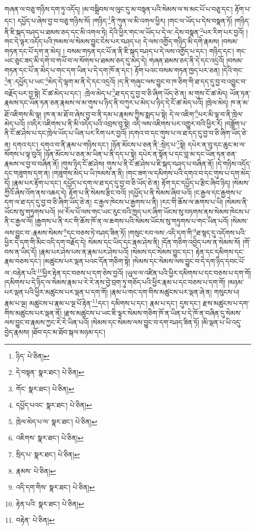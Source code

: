གཞན་ལ་བཅུ་གཉིས་དག་ཏུ་འདོད། །མ་བསྒྲིབས་ལ་ལུང་དུ་མ་བསྟན་པའི་སེམས་ལ་ས་མང་པོ་པ་བཅུ་དང་། རྟོག་པ་དང་། དཔྱོད་པ་ཞེས་བྱ་བ་བཅུ་གཉིས་སོ། །གཉིད་\footnote{ཉིད་  པེ་ཅིན། }ནི་ཀུན་ལ་མི་འགལ་ཕྱིར། །གང་ལ་ཡོད་པ་དེས་བསྣན་ཏོ། །གཉིད་ནི་ཇི་སྐད་བཤད་པ་ཐམས་ཅད་དང་མི་འགལ་ཏེ། དེའི་ཕྱིར་གང་ལ་ཡོད་པ་དེ་ལ་:དེས་བསྣན་\footnote{དེ་བསྟན་  སྣར་ཐང་།  པེ་ཅིན། }པར་རིག་པར་བྱའོ། །གང་དེ་ལྟར་འདོད་པའི་ཁམས་ལ་སེམས་བྱུང་ངེས་པར་བཤད་པ། དེ་ལས་འགྱོད་གཉིད་མི་དགེ་རྣམས། །བསམ་གཏན་དང་པོ་དག་ན་མེད། །
བསམ་གཏན་དང་པོ་ན་ནི་ཇི་སྐད་བཤད་པ་དེ་ལས་འགྱོད་པ་དང་། གཉིད་དང་། གང་ཡང་ཅུང་ཟད་མི་དགེ་བ་གཡོ་བ་ལ་སོགས་པ་ཐམས་ཅད་དུ་མེད་དེ། གཞན་ཐམས་ཅད་ནི་དེ་དང་འདྲའོ། །བསམ་གཏན་དང་པོ་ན་མེད་པ་གང་དག་ཡིན་པ་དེ་དག་ཁོ་ན་དང་། རྟོག་པའང་བསམ་གཏན་ཁྱད་པར་ཅན། །དེའི་གང་\footnote{གོང་  སྣར་ཐང་།  པེ་ཅིན། }ན་:དཔྱོད་པ་ཡང་\footnote{དཔྱོད་པའང་  སྣར་ཐང་།  པེ་ཅིན། }མེད་དེ་ལྷག་མ་ནི་དེ་དང་འདྲའོ། །ད་ནི་གཞུང་ལས་བྱུང་བ་ཁ་ཅིག་གི་ཐ་དད་དུ་བྱ་བ་འབྱུང་བ་བརྗོད་པར་བྱ་སྟེ། ངོ་ཚ་མེད་པ་དང་། :ཁྲེལ་མེད་པ་\footnote{ཁྲེལ་མེད་པ་ལ་  སྣར་ཐང་།  པེ་ཅིན། }ཐ་དད་དུ་བྱ་བ་ཅི་ཞིག་ཡོད་ཅེ་ན། མ་གུས་ངོ་ཚ་མེད། ཡོན་ཏན་རྣམས་དང་ཡོན་ཏན་ཅན་རྣམས་ལ་མ་གུས་པ་ཉིད་ནི་བཀུར་པ་མེད་པ་ཉིད་དེ་ངོ་ཚ་མེད་པའོ། །ཁྲེལ་མེད། ཁ་ན་མ་ཐོ་འཇིགས་མི་ལྟ། །ཁ་ན་མ་ཐོ་བ་ཞེས་བྱ་བ་ནི་དམ་པ་རྣམས་ཀྱིས་སྨད་པ་སྟེ། དེ་ལ་འཇིག་\footnote{འཇིགས་  སྣར་ཐང་།  པེ་ཅིན། }པར་མི་ལྟ་བ་ནི་ཁྲེལ་མེད་པའོ། །འདིར་འཇིགས་པ་ནི་མི་འདོད་པའི་འབྲས་བུ་སྟེ། འདི་ལས་འཇིགས་པར་འགྱུར་བའི་ཕྱིར་རོ། །བཟློག་པ་ནི་ངོ་ཚ་ཤེས་པ་དང་ཁྲེལ་ཡོད་པ་ཡིན་པར་རིག་པར་བྱའོ། །དགའ་བ་དང་གུས་པ་ལ་ཐ་དད་དུ་བྱ་བ་ཅི་ཞིག་ཡོད་ཅེ་ན། དགའ་དང་། དགའ་བ་ནི་རྣམ་པ་གཉིས་དང་། །ཉོན་མོངས་པ་ཅན་ནི་:སྲེད་པ་\footnote{སྲིད་པ་  སྣར་ཐང་།  པེ་ཅིན། }སྟེ། དཔེར་ན་བུ་དང་ཆུང་མ་ལ་སོགས་པ་ལྟ་བུའོ། །ཉོན་མོངས་པ་ཅན་མ་ཡིན་པ་ནི་དད་པ་སྟེ། དཔེར་ན་སྟོན་པ་དང་བླ་མ་དང་ཡོན་ཏན་ཅན་རྣམས་ལ་བྱ་བ་བཞིན་ནོ། །གུས་ཉིད་ངོ་ཚ་ཤེས། གུས་པ་ནི་ངོ་ཚ་ཤེས་པ་ཇི་སྐད་བཤད་པ་བཞིན་ནོ། །དེ་གཉིས་འདོད་དང་གཟུགས་དག་ན། །གཟུགས་མེད་པ་ཡི་ཁམས་ན་ནི། །གང་ཟག་ལ་དམིགས་པའི་དགའ་བ་དང་གུས་པ་དག་མེད་དོ། །རྣམ་པར་རྟོག་པ་དང་། དཔྱོད་པ་དག་ལ་ཐ་དད་དུ་བྱ་བ་ཅི་ཡོད་ཅེ་ན། རྟོག་དང་དཔྱོད་པ་རྩིང་ཞིབ་ཉིད། །སེམས་ཀྱིའོ་ཞེས་འོག་ནས་འཆད་དེ། རྟོག་པ་ནི་སེམས་རྩིང་བའོ། །དཔྱོད་པ་ནི་སེམས་ཞིབ་པའོ། །ང་རྒྱལ་དང་རྒྱགས་པ་དག་ལ་ཐ་དད་དུ་བྱ་བ་ཅི་ཞིག་ཡོད་ཅེ་ན། ང་རྒྱལ་ཁེངས་པ་རྒྱགས་པ་ནི། །རང་གི་ཆོས་ལ་ཆགས་པ་ཡི། །སེམས་ནི་ཡོངས་སུ་གཏུགས་པའོ། །ཕ་རོལ་པོ་ལས་གང་ཡང་རུང་བའི་ཁྱད་པར་ཞིག་ཡོངས་སུ་བཏགས་ནས་སེམས་ཁེངས་པ་ནི་ང་རྒྱལ་ལོ། །རྒྱགས་པ་ནི་རང་གི་ཆོས་ཁོ་ན་ལ་ཆགས་པའི་སེམས་ཡོངས་སུ་གཏུགས་པ་གང་ཡིན་པའོ། །སེམས་ལས་བྱུང་བ་:རྣམས་སེམས་\footnote{རྣམས་  པེ་ཅིན། }དང་བཅས་ཏེ་བཤད་ཟིན་ཏོ། །གསུང་རབ་ལས་:འདི་དག་གི་\footnote{འདི་དག་གིས་  སྣར་ཐང་།  པེ་ཅིན། }ཐ་སྙད་དུ་འདོགས་པའི་ཕྱིར་དེ་དག་གི་མིང་འདི་དག་བརྗོད་དེ། སེམས་དང་ཡིད་དང་རྣམ་ཤེས་ནི། །དོན་གཅིག་འབྱེད་པས་ན་སེམས་སོ། །གོ་བས་ན་ཡིད་དོ། །རྣམ་པར་ཤེས་པས་ན་རྣམ་པར་ཤེས་པའོ། །སེམས་དང་སེམས་བྱུང་དང་། རྟེན་དང་དམིགས་དང་རྣམ་བཅས་དང་། །མཚུངས་པར་ལྡན་པའང་དོན་གཅིག་སྟེ། །སེམས་དང་སེམས་ལས་བྱུང་བ་དེ་དག་ཉིད་དབང་པོ་ལ་:བརྟེན་པའི་\footnote{རྟེན་པའི་  སྣར་ཐང་།  པེ་ཅིན། }ཕྱིར་རྟེན་དང་བཅས་པ་དག་ཅེས་བྱའོ། །ཡུལ་ལ་འཛིན་པའི་ཕྱིར་དམིགས་པ་དང་བཅས་པ་དག་གོ། །དམིགས་པ་དེ་ཉིད་ལ་སེམས་རྣམ་པ་རེ་རེ་ནས་བྱེ་བྲག་ཏུ་གཅོད་པའི་ཕྱིར་རྣམ་པ་དང་བཅས་པ་དག་གོ། །མཉམ་པར་ལྡན་པའི་ཕྱིར་མཚུངས་པར་ལྡན་པ་དག་གོ། །རྣམ་པ་གང་དག་གིས་མཚུངས་པར་ལྡན་ཞེ་ན། གསུངས་པ། རྣམ་པ་ལྔ། མཚུངས་པ་རྣམ་པ་ལྔ་པོ་རྟེན་\footnote{བརྟེན་  པེ་ཅིན། }དང་། དམིགས་པ་དང་། རྣམ་པ་དང་། དུས་དང་། རྫས་མཚུངས་པ་དག་གིས་མཚུངས་པར་ལྡན་ནོ། །རྫས་མཚུངས་པ་ཡང་ཇི་ལྟར་སེམས་གཅིག་ཁོ་ན་ཡིན་པ་དེ་ཁོ་ན་བཞིན་དུ་སེམས་ལས་བྱུང་བ་རྣམས་ཀྱང་རེ་རེ་ཡིན་པའོ། །སེམས་དང་སེམས་ལས་བྱུང་བ་དག་བཤད་ཟིན་ཏོ། །མི་ལྡན་པ་ཡི་འདུ་བྱེད་རྣམས། །ཐོབ་དང་མ་ཐོབ་སྐལ་མཉམ་དང་། 